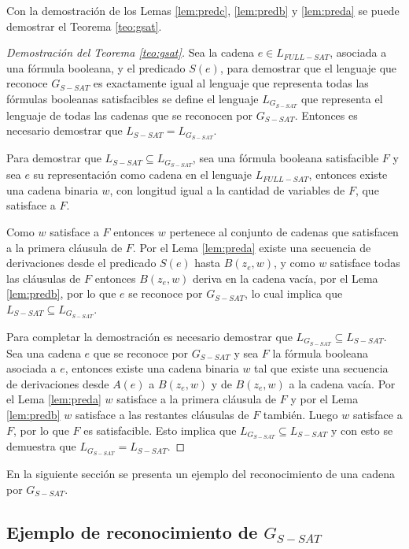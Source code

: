 \documentclass[12pt]{article}
\begin{document}
Con la demostración de los Lemas \ref{lem:predc}, \ref{lem:predb} y \ref{lem:preda} se puede demostrar el Teorema \ref{teo:gsat}.

\begin{proof}[Demostración del Teorema \ref{teo:gsat}]
    Sea la cadena $e\in L_{FULL-SAT}$, asociada a una fórmula booleana, y el predicado $S(e)$, para demostrar que el lenguaje que reconoce $G_{S-SAT}$ es exactamente igual al lenguaje que representa todas las fórmulas booleanas satisfacibles se define el lenguaje $L_{G_{S-SAT}}$ que representa el lenguaje de todas las cadenas que se reconocen por $G_{S-SAT}$. Entonces es necesario demostrar que $L_{S-SAT}=L_{G_{S-SAT}}$.
    
    Para demostrar que $L_{S-SAT}\subseteq L_{G_{S-SAT}}$, sea una fórmula booleana satisfacible $F$ y sea $e$ su representación como cadena en el lenguaje $L_{FULL-SAT}$, entonces existe una cadena binaria $w$, con longitud igual a la cantidad de variables de $F$, que satisface a $F$.
    
    Como $w$ satisface a $F$ entonces $w$ pertenece al conjunto de cadenas que satisfacen a la primera cláusula de $F$. Por el Lema \ref{lem:preda} existe una secuencia de derivaciones desde el predicado $S(e)$ hasta $B(z_e,w)$, y como $w$ satisface todas las cláusulas de $F$ entonces $B(z_e,w)$ deriva en la cadena vacía, por el Lema \ref{lem:predb}, por lo que $e$ se reconoce por $G_{S-SAT}$, lo cual implica que $L_{S-SAT}\subseteq L_{G_{S-SAT}}$.
    
    Para completar la demostración es necesario demostrar que $ L_{G_{S-SAT}}\subseteq L_{S-SAT}$. Sea una cadena $e$ que se reconoce por $G_{S-SAT}$ y sea $F$ la fórmula booleana asociada a $e$, entonces existe una cadena binaria $w$ tal que existe una secuencia de derivaciones desde $A(e)$ a $B(z_e,w)$ y de $B(z_e,w)$ a la cadena vacía. Por el Lema \ref{lem:preda} $w$ satisface a la primera cláusula de $F$ y por el Lema  \ref{lem:predb} $w$ satisface a las restantes cláusulas de $F$ también. Luego $w$ satisface a $F$, por lo que $F$ es satisfacible. Esto implica que $L_{G_{S-SAT}}\subseteq L_{S-SAT}$ y con esto se demuestra que $L_{G_{S-SAT}}= L_{S-SAT}$.
\end{proof}


En la siguiente sección se presenta un ejemplo del reconocimiento de una cadena por $G_{S-SAT}$.

\subsection{Ejemplo de reconocimiento de $G_{S-SAT}$}
\end{document}
